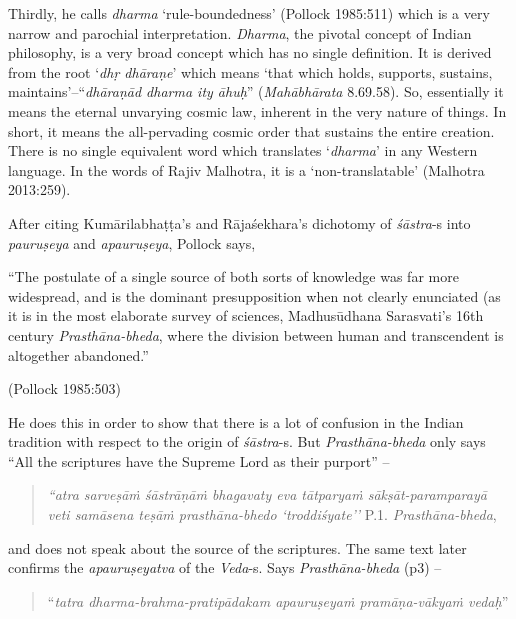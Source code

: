 Thirdly, he calls {\it dharma} `rule-boundedness' (Pollock 1985:511) which is a very narrow and parochial interpretation. {\it Dharma}, the pivotal concept of Indian philosophy, is a very broad concept which has no single definition. It is derived from the root `\textsl{dhṛ dhāraṇe}' which means `that which holds, supports, sustains, maintains'--``\textsl{dhāraṇād dharma ity āhuḥ}'' ({\it Mahābhārata} 8.69.58). So, essentially it means the eternal unvarying cosmic law, inherent in the very nature of things. In short, it means the all-pervading cosmic order that sustains the entire creation. There is no single equivalent word which translates `{\it dharma}' in any Western language. In the words of Rajiv Malhotra, it is a `non-translatable' (Malhotra 2013:259).

After citing Kumārilabhaṭṭa's and Rājaśekhara's dichotomy of {\it śāstra}-s into {\it pauruṣeya} and {\it apauruṣeya}, Pollock says,
\begin{myquote}
``The postulate of a single source of both sorts of knowledge was far more widespread, and is the dominant presupposition when not clearly enunciated (as it is in the most elaborate survey of sciences, Madhusūdhana Sarasvati's 16th century {\sl Prasthāna-bheda}, where the division between human and transcendent is altogether abandoned.'' 

\hfill (Pollock 1985:503)
\end{myquote}

He does this in order to show that there is a lot of confusion in the Indian tradition with respect to the origin of {\sl śāstra}-s. But {\sl Prasthāna-bheda} only says ``All the scriptures have the Supreme Lord as their purport'' -- 

\begin{quote}
{{\sl ``atra sarveṣāṁ śāstrāṇāṁ bhagavaty eva tātparyaṁ sākṣāt-paramparayā veti samāsena teṣāṁ prasthāna-bhedo `troddiśyate''}} P.1. {\sl Prasthāna-bheda}, 
\end{quote}
\noindent
and does not speak about the source of the scriptures. The same text later confirms the {\sl apauruṣeyatva} of the {\sl Veda}-s. Says {\sl Prasthāna-bheda} (p3) -- 

\begin{quote}
``{{\sl tatra dharma-brahma-pratipādakam apauruṣeyaṁ pramāṇa-vākyaṁ vedaḥ}}'' 
\end{quote}

